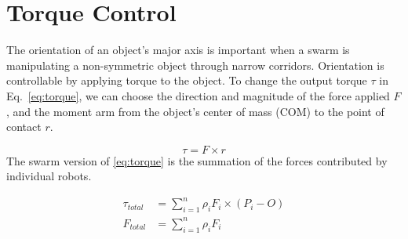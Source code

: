 \section{Torque Control}
\label{sec:theory}


The orientation of an object's major axis is important when a swarm is manipulating a non-symmetric object through narrow corridors. 
Orientation is controllable by applying torque to the object. 
To change the output torque $\tau$ in Eq.~\eqref{eq:torque}, we can choose the direction and magnitude of the force applied $F$, and the moment arm from the object's center of mass (COM) to the point of contact $r$.

\begin{equation}
\tau = F \times r\label{eq:torque}
\end{equation}
The swarm version of \eqref{eq:torque} is the summation of the forces contributed by individual robots.

\begin{align}
\tau_{total} &= \sum\limits_{i=1}^n \rho_i F_i \times (P_i - O )   \label{eq:swarmtorque}\\
F_{total} &= \sum\limits_{i=1}^n \rho_i F_i  \label{eq:swarmforce}
\end{align}

